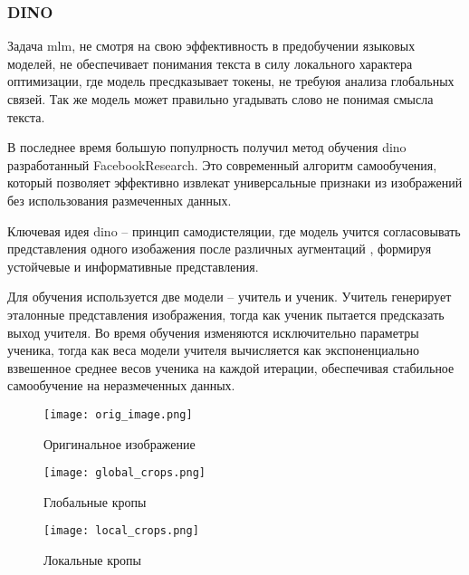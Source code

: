 \documentclass[../part_1.tex]{subfiles}
\begin{document}
    \subsubsection{DINO}
    \par Задача \acrshort{mlm}, не смотря на свою эффективность в предобучении языковых моделей, не обеспечивает понимания текста в силу локального характера оптимизации, где модель пресдказывает токены, не требуюя анализа глобальных связей. Так же модель может правильно угадывать слово не понимая смысла текста.
    \par В последнее время большую популрность получил метод обучения \acrshort{dino}\cite{caron2021emergingpropertiesselfsupervisedvision, oquab2024dinov2learningrobustvisual, darcet2024visiontransformersneedregisters} разработанный FacebookResearch. Это современный алгоритм самообучения, который позволяет эффективно извлекат универсальные признаки из изображений без использования размеченных данных. 
    \par Ключевая идея \acrshort{dino} -- принцип самодистеляции, где модель учится согласовывать представления одного изобажения после различных аугментаций , формируя устойчевые и информативные представления. 
    \par Для обучения используется две модели -- учитель и ученик. Учитель генерирует эталонные представления изображения, тогда как ученик пытается предсказать выход учителя. Во время обучения изменяются исключительно параметры ученика, тогда как веса модели учителя вычисляется как экспоненциально взвешенное среднее весов ученика на каждой итерации, обеспечивая стабильное самообучение на неразмеченных данных.
    \begin{figure*}[h]
        \begin{subfigure}{0.33\textwidth}
            \texttt{[image: orig\_image.png]}
            \caption{Оригинальное изображение}
        \end{subfigure}%
        \hfill
        \begin{subfigure}{0.33\textwidth}
            \texttt{[image: global\_crops.png]}
            \caption{Глобальные кропы}
        \end{subfigure}%
        \hfill
        \begin{subfigure}{0.33\textwidth}
            \texttt{[image: local\_crops.png]}
            \caption{Локальные кропы}
        \end{subfigure}%
        \label{fig:multicrop_augment}
    \end{figure*}
\end{document}

